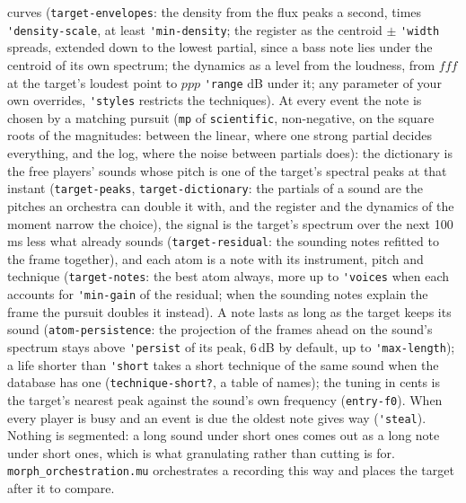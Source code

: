 \documentclass[11pt,a4paper]{article}
\newcommand{\musil}[1]{\lstinline[style=musilinline]{#1}}
\begin{document}
curves (\musil{target-envelopes}: the density from the flux peaks a second, times
\musil{'density-scale}, at least \musil{'min-density}; the register as the centroid $\pm$ \musil{'width} spreads, extended down
to the lowest partial, since a bass note lies under the centroid of its own spectrum; the
dynamics as a level from the loudness, from $fff$ at the target's loudest point to $ppp$
\musil{'range} dB under it; any parameter of your own overrides, \musil{'styles} restricts
the techniques). At every event the note is chosen by a matching pursuit (\musil{mp} of
\texttt{scientific}, non-negative, on the square roots of the magnitudes: between the
linear, where one strong partial decides everything, and the log, where the noise between
partials does): the dictionary is the free players' sounds whose pitch is one of the
target's spectral peaks at that instant (\musil{target-peaks}, \musil{target-dictionary}:
the partials of a sound are the pitches an orchestra can double it with, and the register
and the dynamics of the moment narrow the choice), the signal is the target's spectrum
over the next 100\,ms less what already sounds (\musil{target-residual}: the sounding
notes refitted to the frame together), and each atom is a note with its instrument, pitch
and technique (\musil{target-notes}: the best atom always, more up to \musil{'voices} when
each accounts for \musil{'min-gain} of the residual; when the sounding notes explain the
frame the pursuit doubles it instead). A note lasts as long as the target keeps its sound
(\musil{atom-persistence}: the projection of the frames ahead on the sound's spectrum stays
above \musil{'persist} of its peak, 6\,dB by default, up to \musil{'max-length}); a life
shorter than \musil{'short} takes a short technique of the same sound when the database
has one (\musil{technique-short?}, a table of names); the tuning in cents is the target's
nearest peak against the sound's own frequency (\musil{entry-f0}). When every player is
busy and an event is due the oldest note gives way (\musil{'steal}). Nothing is segmented:
a long sound under short ones comes out as a long note under short ones, which is what
granulating rather than cutting is for. \texttt{morph\_orchestration.mu} orchestrates a
recording this way and places the target after it to compare.
\end{document}
